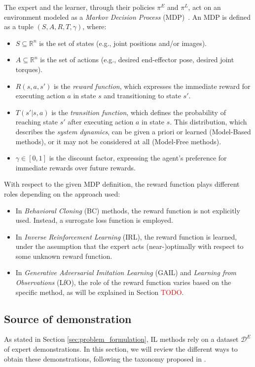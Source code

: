 The expert and the learner, through their policies $\pi^{E}$ and $\pi^{L}$, act on an environment modeled as a \textit{Markov Decision Process} (MDP)~\cite{kroemer2021review_robot_learning}. An MDP is defined as a tuple $(S, A, R, T, \gamma)$, where:
\begin{itemize}
    \item $S \subseteq \mathbb{R}^{n}$ is the set of states (e.g., joint positions and/or images).
    \item $A \subseteq \mathbb{R}^{n}$ is the set of actions (e.g., desired end-effector pose, desired joint torques).
    \item $R(s, a, s')$ is the \textit{reward function}, which expresses the immediate reward for executing action $a$ in state $s$ and transitioning to state $s'$.
    \item $T(s' | s, a)$ is the \textit{transition function}, which defines the probability of reaching state $s'$ after executing action $a$ in state $s$. This distribution, which describes the \textit{system dynamics}, can be given a priori or learned (Model-Based methods), or it may not be considered at all (Model-Free methods).
    \item $\gamma \in [0,1]$ is the discount factor, expressing the agent's preference for immediate rewards over future rewards.
\end{itemize}

With respect to the given MDP definition, the reward function plays different roles depending on the approach used:
\begin{itemize}
    \item In \textit{Behavioral Cloning} (BC) methods, the reward function is not explicitly used. Instead, a surrogate loss function is employed.
    \item In \textit{Inverse Reinforcement Learning} (IRL), the reward function is learned, under the assumption that the expert acts (near-)optimally with respect to some unknown reward function.
    \item In \textit{Generative Adversarial Imitation Learning} (GAIL) and \textit{Learning from Observations} (LfO), the role of the reward function varies based on the specific method, as will be explained in Section \textcolor{red}{TODO}.
\end{itemize}



\subsection{Source of demonstration}
\label{sec:sod}
As stated in Section \ref{sec:problem_formulation}, IL methods rely on a dataset $\mathcal{D}^{E}$ of expert demonstrations. In this section, we will review the different ways to obtain these demonstrations, following the taxonomy proposed in \cite{fang2019survey}.

